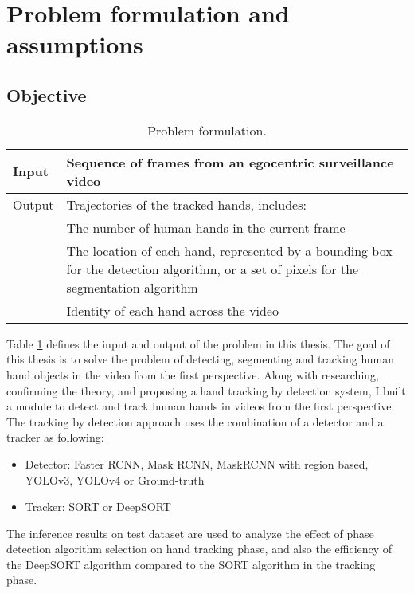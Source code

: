 \section{Problem formulation and assumptions}
\subsection{Objective}
\begin{table}
	\caption{Problem formulation.}
	\label{formulation}
	\begin{tabular}{|l|p{13cm}|}
		
		\hline 
		Input &  Sequence of frames from an egocentric surveillance video\\ 
		\hline 
		Output & Trajectories of the tracked hands, includes: \\
		& \tabitem The number of human hands in the current frame \\
		& \tabitem The location of each hand, represented by a bounding box for the detection algorithm, or a set of pixels for the segmentation algorithm \\
		& \tabitem Identity of each hand across the video
\\ 
		\hline 
	\end{tabular}
\end{table}
Table \ref{formulation} defines the input and output of the problem in this thesis. The goal of this thesis is to solve the problem of detecting, segmenting and tracking human hand objects in the video from the first perspective. Along with researching, confirming the theory, and proposing a hand tracking by detection system, I built a module to detect and track human hands in videos from the first perspective. The tracking by detection approach uses the combination of a detector and a tracker as following:
\begin{itemize}
	\item Detector: Faster RCNN, Mask RCNN, MaskRCNN with region based, YOLOv3, YOLOv4 or Ground-truth
	\item Tracker: SORT or DeepSORT
\end{itemize}
The inference results on test dataset are used to analyze the effect of phase detection algorithm selection on hand tracking phase, and also the efficiency of the DeepSORT algorithm compared to the SORT algorithm in the tracking phase.
